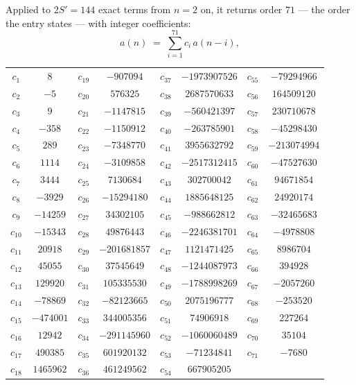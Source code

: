 \documentclass[11pt,a4paper]{article}
\theoremstyle{plain}
\theoremstyle{definition}
\begin{document}
Applied to $2S'=144$ exact terms from $n=2$ on, it returns order $71$ --- the
order the entry states --- with integer coefficients:
\[
a(n)\;=\;\sum_{i=1}^{71}c_i\,a(n-i),
\]
\begin{center}\small
\begin{tabular}{cccccccc}
$c_{1}$ & $8$ & $c_{19}$ & $-907094$ & $c_{37}$ & $-1973907526$ & $c_{55}$ & $-79294966$ \\
$c_{2}$ & $-5$ & $c_{20}$ & $576325$ & $c_{38}$ & $2687570633$ & $c_{56}$ & $164509120$ \\
$c_{3}$ & $9$ & $c_{21}$ & $-1147815$ & $c_{39}$ & $-560421397$ & $c_{57}$ & $230710678$ \\
$c_{4}$ & $-358$ & $c_{22}$ & $-1150912$ & $c_{40}$ & $-263785901$ & $c_{58}$ & $-45298430$ \\
$c_{5}$ & $289$ & $c_{23}$ & $-7348770$ & $c_{41}$ & $3955632792$ & $c_{59}$ & $-213074994$ \\
$c_{6}$ & $1114$ & $c_{24}$ & $-3109858$ & $c_{42}$ & $-2517312415$ & $c_{60}$ & $-47527630$ \\
$c_{7}$ & $3444$ & $c_{25}$ & $7130684$ & $c_{43}$ & $302700042$ & $c_{61}$ & $94671854$ \\
$c_{8}$ & $-3929$ & $c_{26}$ & $-15294180$ & $c_{44}$ & $1885648125$ & $c_{62}$ & $24920174$ \\
$c_{9}$ & $-14259$ & $c_{27}$ & $34302105$ & $c_{45}$ & $-988662812$ & $c_{63}$ & $-32465683$ \\
$c_{10}$ & $-15343$ & $c_{28}$ & $49876443$ & $c_{46}$ & $-2246381701$ & $c_{64}$ & $-4978808$ \\
$c_{11}$ & $20918$ & $c_{29}$ & $-201681857$ & $c_{47}$ & $1121471425$ & $c_{65}$ & $8986704$ \\
$c_{12}$ & $45055$ & $c_{30}$ & $37545649$ & $c_{48}$ & $-1244087973$ & $c_{66}$ & $394928$ \\
$c_{13}$ & $129920$ & $c_{31}$ & $105335530$ & $c_{49}$ & $-1788998269$ & $c_{67}$ & $-2057260$ \\
$c_{14}$ & $-78869$ & $c_{32}$ & $-82123665$ & $c_{50}$ & $2075196777$ & $c_{68}$ & $-253520$ \\
$c_{15}$ & $-474001$ & $c_{33}$ & $344005356$ & $c_{51}$ & $74906918$ & $c_{69}$ & $227264$ \\
$c_{16}$ & $12942$ & $c_{34}$ & $-291145960$ & $c_{52}$ & $-1060060489$ & $c_{70}$ & $35104$ \\
$c_{17}$ & $490385$ & $c_{35}$ & $601920132$ & $c_{53}$ & $-71234841$ & $c_{71}$ & $-7680$ \\
$c_{18}$ & $1465962$ & $c_{36}$ & $461249562$ & $c_{54}$ & $667905205$ &  &  \\
\end{tabular}
\end{center}
\end{document}
